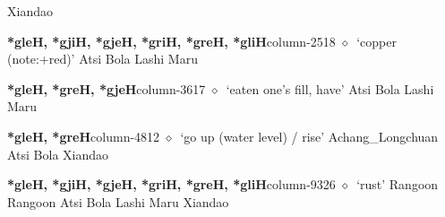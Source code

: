 \hspace{1ex}
         Xiandao 
  \item {\footnotesize \textbf{*gleH, *gjiH, *gjeH, *griH, *greH, *gliH}}{\tiny column-2518}
         $\diamond$~`copper (note:+red)'
         Atsi 
\hspace{1ex}
         Bola 
\hspace{1ex}
         Lashi 
\hspace{1ex}
         Maru 
  \item {\footnotesize \textbf{*gleH, *greH, *gjeH}}{\tiny column-3617}
         $\diamond$~`eaten one's fill, have'
         Atsi 
\hspace{1ex}
         Bola 
\hspace{1ex}
         Lashi 
\hspace{1ex}
         Maru 
  \item {\footnotesize \textbf{*gleH, *greH}}{\tiny column-4812}
         $\diamond$~`go up (water level) / rise'
         Achang\_Longchuan 
\hspace{1ex}
         Atsi 
\hspace{1ex}
         Bola 
\hspace{1ex}
         Xiandao 
  \item {\footnotesize \textbf{*gleH, *gjiH, *gjeH, *griH, *greH, *gliH}}{\tiny column-9326}
         $\diamond$~`rust'
         Rangoon 
\hspace{1ex}
         Rangoon 
\hspace{1ex}
         Atsi 
\hspace{1ex}
         Bola 
\hspace{1ex}
         Lashi 
\hspace{1ex}
         Maru 
\hspace{1ex}
         Xiandao 
